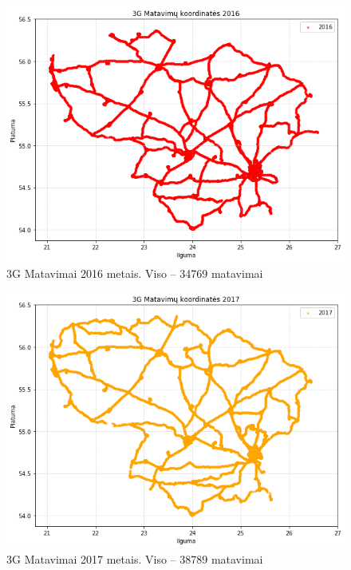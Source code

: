 \documentclass{VUMIFPSbakalaurinis}
\begin{document}
\begin{figure}[H]
	\centering
	\includegraphics[scale=0.33]{img/3G-3}
	\caption{3G Matavimai 2016 metais. Viso – 34769 matavimai}
	\label{img:3G-3}
\end{figure}
\begin{figure}[H]
	\centering
	\includegraphics[scale=0.33]{img/3G-4}
	\caption{3G Matavimai 2017 metais. Viso – 38789 matavimai}
	\label{img:3G-4}
\end{figure}
\end{document}
